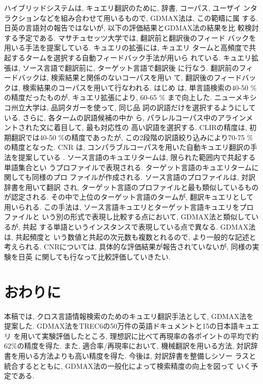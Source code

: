 
ハイブリッドシステムは, キュエリ翻訳のために, 辞書, コーパス, ユーザイ
ンタラクションなどを組み合わせて用いるもので, GDMAX法は, この範疇に属
する. 日英の言語対の報告ではないが, 以下の評価結果とGDMAX法の結果を比
較検討する予定である. マサチュセッツ大学では, 翻訳前と翻訳後のフィード
バックを用いる手法を提案している\cite{1}. キュエリの拡張には, キュエリ
タームと高頻度で共起するタームを選択する自動フィードバック手法が用いら
れている. キュエリ拡張は, ソース言語で翻訳前に, ターゲット言語で翻訳後
に行なう. 翻訳前のフィードバックは, 検索結果と関係のないコーパスを用い
て, 翻訳後のフィードバックは, 検索結果のコーパスを用いて行なわれる. はじめ
は, 単言語検索の40-50 \%の精度だったものが, キュエリ拡張により, 60-65
\% まで向上した\cite{1}. 
ニューメキシコ州立大学は, 品詞タガーを使って, 同じ品
詞の訳語だけを選択するようにしている. さらに, 各タームの訳語候補の中か
ら, パラレルコーパス中のアラインメントされた文に着目して, 最も対応性の
高い訳語を選択する. CLIRの精度は, 初期翻訳では40-50 \%の精度であったが, 
この2段階の訳語絞り込みにより70-75 \% の精度となった\cite{5}. CNR は, 
コンパラブルコーパスを用いた自動キュエリ翻訳の手法を提案している
\cite{20}. ソース言語のキュエリタームは, 限られた範囲内で共起する単語集合とい
うプロファイルで表現される. ターゲット言語のキュエリタームに関しても同様のプロ
ファイルが作成される. ソース言語のプロファイルは, 対訳辞書を用いて翻訳
され, ターゲット言語のプロファイルと最も類似しているものが認定される. 
その中で上位のターゲット言語のタームが, 翻訳キュエリとして用いられる. 
この手法は, ソース言語キュエリとターゲット言語キュエリをプロファイルと
いう別の形式で表現し比較する点において, GDMAX法と類似しているが, 共起
する単語というインスタンスで表現している点で異なる. GDMAX法は, 共起頻度と
いう数値と共起の次元数も複数とれるので, より一般的な記述と考えられる. 
CNRについては, 具体的な評価結果が報告されていないが, 同様の実験を日英
に関しても行なって比較評価していきたい. 


\section{おわりに}

本稿では, クロス言語情報検索のためのキュエリ翻訳手法として, GDMAX法を
提案した. GDMAX法をTREC6の50万件の英語ドキュメントと15の日本語キュエリ
を用いて実験評価したところ, 理想訳に比べて再現率の各ポイントの平均で約
62\%の精度を得た. また, 適合率/再現率において, 機械翻訳を用いる方法, 
対訳辞書を用いる方法よりも高い精度を得た. 今後は, 対訳辞書を整備しシソー
ラスと統合するとともに, GDMAX法の一般化によって検索精度の向上を図って
いく予定である. 


